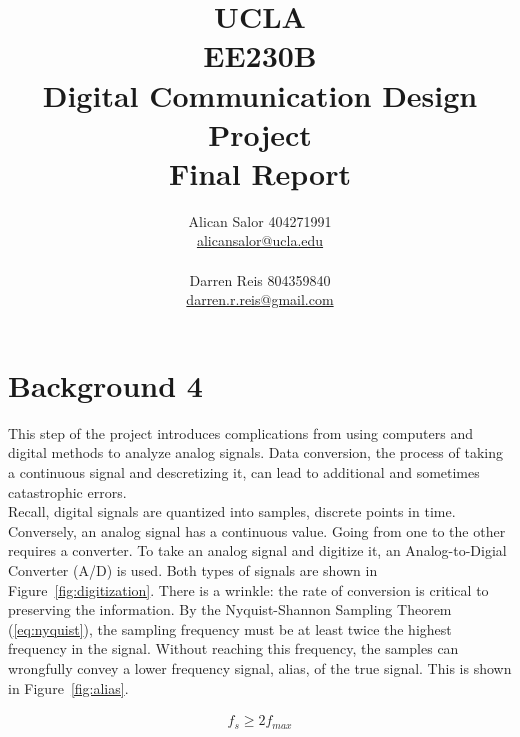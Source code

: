 \documentclass[]{article}
\title{UCLA\\EE230B\\Digital Communication Design Project\\Final Report}
\author{Alican Salor 404271991 \\  \href{mailto:alicansalor@ucla.edu}{alicansalor@ucla.edu} \\ \\
Darren Reis 804359840 \\
\href{mailto:darrer.r.reis@gmail.com}{darren.r.reis@gmail.com} }
\begin{document}
\maketitle

\newpage
\tableofcontents


\section{Background 4}
\label{sec:adbackground}
This step of the project introduces complications from using computers and digital methods to analyze analog signals.  Data conversion, the process of taking a continuous signal and descretizing it, can lead to additional and sometimes catastrophic errors.\\

Recall, digital signals are quantized into samples, discrete points in time.  Conversely, an analog signal has a continuous value.  Going from one to the other requires a converter.  To take an analog signal and digitize it, an Analog-to-Digial Converter (A/D) is used.  Both types of signals are shown in Figure~\ref{fig:digitization}.  There is a wrinkle: the rate of conversion is critical to preserving the information.  By the Nyquist-Shannon Sampling Theorem (\ref{eq:nyquist}), the sampling frequency must be at least twice the highest frequency in the signal.  Without reaching this frequency, the samples can wrongfully convey a lower frequency signal, alias, of the true signal.  This is shown in Figure~\ref{fig:alias}.  

\begin{align}
\label{eq:nyquist}
f_s \geq 2 f_{max}
\end{align}
\end{document}
